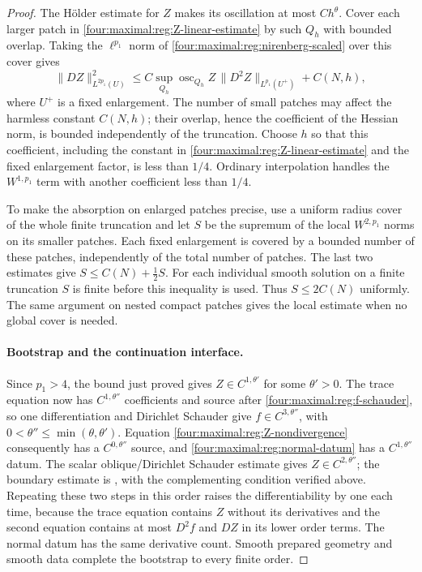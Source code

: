 \begin{proof}
The H\"older estimate for $Z$ makes its oscillation at most $Ch^\theta$.
Cover each larger patch in \eqref{four:maximal:reg:Z-linear-estimate} by such
$Q_h$ with bounded overlap.  Taking the $\ell^{p_1}$ norm of
\eqref{four:maximal:reg:nirenberg-scaled} over this cover gives
\[
 \|DZ\|_{L^{2p_1}(U)}^2
 \le C\sup_{Q_h}\operatorname{osc}_{Q_h}Z\,
                 \|D^2Z\|_{L^{p_1}(U^+)}+C(N,h),
\]
where $U^+$ is a fixed enlargement.  The number of small patches
may affect the harmless constant $C(N,h)$; their overlap, hence the
coefficient of the Hessian norm, is bounded independently of the
truncation.  Choose $h$ so that this coefficient, including the
constant in \eqref{four:maximal:reg:Z-linear-estimate} and the fixed enlargement
factor, is less than $1/4$.  Ordinary interpolation handles the
$W^{1,p_1}$ term with another coefficient less than $1/4$.

To make the absorption on enlarged patches precise, use a uniform
radius cover of the whole finite truncation and let $S$ be the
supremum of the local $W^{2,p_1}$ norms on its smaller patches.
Each fixed enlargement is covered by a bounded number of these
patches, independently of the total number of patches.  The last
two estimates give $S\le C(N)+\tfrac12S$.  For each individual
smooth solution on a finite truncation $S$ is finite before this
inequality is used.  Thus $S\le2C(N)$ uniformly.  The same argument
on nested compact patches gives the local estimate when no global
cover is needed.

\paragraph{Bootstrap and the continuation interface.}
Since $p_1>4$, the bound just proved gives
$Z\in C^{1,\theta'}$ for some $\theta'>0$.  The trace equation now
has $C^{1,\theta''}$ coefficients and source after
\eqref{four:maximal:reg:f-schauder}, so one differentiation and Dirichlet
Schauder give $f\in C^{3,\theta''}$, with
$0<\theta''\le\min(\theta,\theta')$.  Equation
\eqref{four:maximal:reg:Z-nondivergence} consequently has a
$C^{0,\theta''}$ source, and \eqref{four:maximal:reg:normal-datum} has a
$C^{1,\theta''}$ datum.  The scalar oblique/Dirichlet Schauder
estimate gives $Z\in C^{2,\theta''}$; the boundary estimate is
\cite[Theorem~7.3, estimate~(7.8), p.~668]{AgmonDouglisNirenberg1959}, with the
complementing condition verified above.
Repeating these two steps in this order raises the differentiability
by one each time, because the trace equation contains $Z$ without
its derivatives and the second equation contains at most $D^2f$
and $DZ$ in its lower order terms.  The normal datum has the same
derivative count.  Smooth prepared geometry and smooth data complete
the bootstrap to every finite order.


\end{proof}
